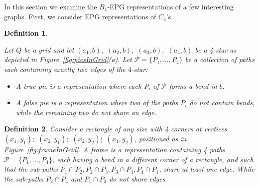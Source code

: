 \documentclass[9pt]{entcs}
\newtheorem{defi}{Definition}[section]
\begin{document}

% 

In this section we examine the $B_1$-EPG representations of a few interesting graphs. First, we consider EPG representations of $C_4$'s.


\begin{defi} \label{defi:tortasFrame}

Let $ Q $ be a grid and let $ (a_1, b),$ $(a_2, b),$ $(a_3, b),$ $(a_4, b)$ be a 4-star as depicted in Figure~\ref{fig:piesInGrid}(a). Let $ \mathcal{P} = \{P_1, \dots , P_4\}$ be a collection of paths each containing exactly two edges of the $4$-star:

\begin{itemize}
\item A \emph{true pie} is a representation where each $P_i$ of $ \mathcal{P} $ forms a bend in $b$.

\item A \emph {false pie} is a representation where two of the paths $P_i$ do not contain bends, while the remaining two do not share an edge. 




\end{itemize}
\end{defi}

\begin{defi} \label{defi:tortasFrame2}
 Consider a rectangle of any size with 4 corners at vertices $ (x_1, y_1);$ $(x_2, y_1);$ $(x_2, y_2);$ $(x_1, y_2) $, positioned as in  Figure~\ref{fig:frameInGrid}. A \emph{frame} is a representation containing 4 paths $\mathcal{P} =  \{ P_1, \dots, P_4\} $, each having a bend in a different corner of a rectangle, and such that the  sub-paths $ P_1 \cap P_2, P_2 \cap P_3, P_3 \cap P_4, P_4 \cap P_1 $, share at least one edge. While the sub-paths $ P_2 \cap P_4 $ and $ P_1 \cap P_3 $ do not share edges.



\end{defi}
\end{document}
